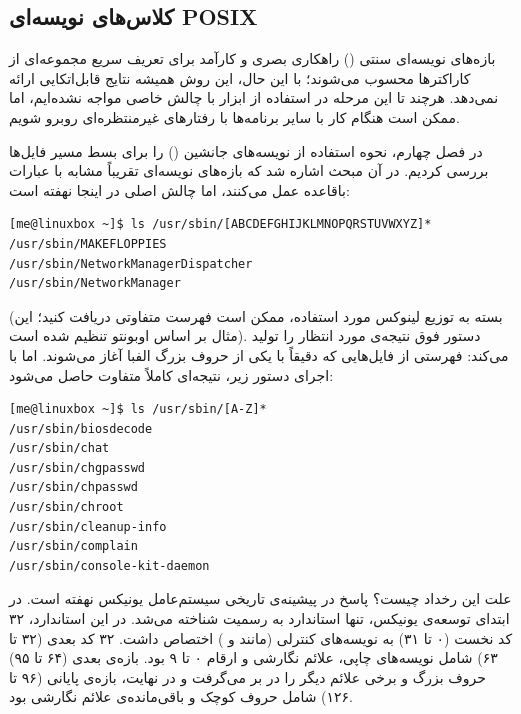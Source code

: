 \subsection{کلاس‌های نویسه‌ای POSIX}

بازه‌های نویسه‌ای سنتی () راهکاری بصری و کارآمد برای تعریف سریع مجموعه‌ای از کاراکترها محسوب می‌شوند؛ با این حال، این روش همیشه نتایج قابل‌اتکایی ارائه نمی‌دهد. هرچند تا این مرحله در استفاده از ابزار  با چالش خاصی مواجه نشده‌ایم، اما ممکن است هنگام کار با سایر برنامه‌ها با رفتارهای غیرمنتظره‌ای روبرو شویم.

در فصل چهارم، نحوه استفاده از نویسه‌های جانشین () را برای بسط مسیر فایل‌ها بررسی کردیم. در آن مبحث اشاره شد که بازه‌های نویسه‌ای تقریباً مشابه با عبارات باقاعده عمل می‌کنند، اما چالش اصلی در اینجا نهفته است:

\begin{latin}
\begin{lstlisting}
[me@linuxbox ~]$ ls /usr/sbin/[ABCDEFGHIJKLMNOPQRSTUVWXYZ]*
/usr/sbin/MAKEFLOPPIES
/usr/sbin/NetworkManagerDispatcher
/usr/sbin/NetworkManager
\end{lstlisting}
\end{latin}

(بسته به توزیع لینوکس مورد استفاده، ممکن است فهرست متفاوتی دریافت کنید؛ این مثال بر اساس اوبونتو تنظیم شده است). دستور فوق نتیجه‌ی مورد انتظار را تولید می‌کند: فهرستی از فایل‌هایی که دقیقاً با یکی از حروف بزرگ الفبا آغاز می‌شوند. اما با اجرای دستور زیر، نتیجه‌ای کاملاً متفاوت حاصل می‌شود:

\begin{latin}
\begin{lstlisting}
[me@linuxbox ~]$ ls /usr/sbin/[A-Z]*
/usr/sbin/biosdecode
/usr/sbin/chat
/usr/sbin/chgpasswd
/usr/sbin/chpasswd
/usr/sbin/chroot
/usr/sbin/cleanup-info
/usr/sbin/complain
/usr/sbin/console-kit-daemon
\end{lstlisting}
\end{latin}

علت این رخداد چیست؟ پاسخ در پیشینه‌ی تاریخی سیستم‌عامل یونیکس نهفته است. در ابتدای توسعه‌ی یونیکس، تنها استاندارد  به رسمیت شناخته می‌شد. در این استاندارد، ۳۲ کد نخست (۰ تا ۳۱) به نویسه‌های کنترلی (مانند  و ) اختصاص داشت. ۳۲ کد بعدی (۳۲ تا ۶۳) شامل نویسه‌های چاپی، علائم نگارشی و ارقام ۰ تا ۹ بود. بازه‌ی بعدی (۶۴ تا ۹۵) حروف بزرگ و برخی علائم دیگر را در بر می‌گرفت و در نهایت، بازه‌ی پایانی (۹۶ تا ۱۲۶) شامل حروف کوچک و باقی‌مانده‌ی علائم نگارشی بود.

